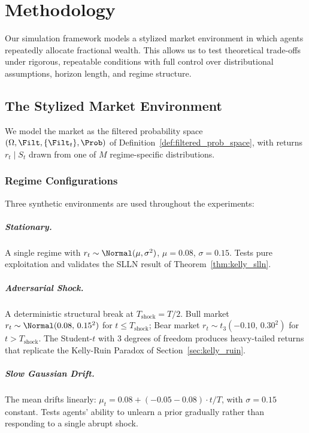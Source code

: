 \chapter{Methodology}
\label{ch:methodology}

Our simulation framework models a stylized market environment in which agents
repeatedly allocate fractional wealth.  This allows us to test theoretical
trade-offs under rigorous, repeatable conditions with full control over
distributional assumptions, horizon length, and regime structure.

\section{The Stylized Market Environment}

We model the market as the filtered probability space
$(\Omega,\Filt,\{\Filt_t\},\Prob)$ of Definition~\ref{def:filtered_prob_space},
with returns $r_t \mid S_t$ drawn from one of $M$ regime-specific distributions.

\subsection{Regime Configurations}

Three synthetic environments are used throughout the experiments:

\paragraph{Stationary.}
A single regime with $r_t \sim \Normal(\mu,\sigma^2)$, $\mu=0.08$,
$\sigma=0.15$.  Tests pure exploitation and validates the SLLN result of
Theorem~\ref{thm:kelly_slln}.

\paragraph{Adversarial Shock.}
A deterministic structural break at $T_{\text{shock}} = T/2$.  Bull market
$r_t \sim \Normal(0.08,\,0.15^2)$ for $t \leq T_{\text{shock}}$; Bear market
$r_t \sim t_3(-0.10,\,0.30^2)$ for $t > T_{\text{shock}}$.  The Student-$t$
with 3 degrees of freedom produces heavy-tailed returns that replicate the
Kelly-Ruin Paradox of Section~\ref{sec:kelly_ruin}.

\paragraph{Slow Gaussian Drift.}
The mean drifts linearly: $\mu_t = 0.08 + (-0.05 - 0.08)\cdot t/T$, with
$\sigma=0.15$ constant.  Tests agents' ability to unlearn a prior gradually
rather than responding to a single abrupt shock.

